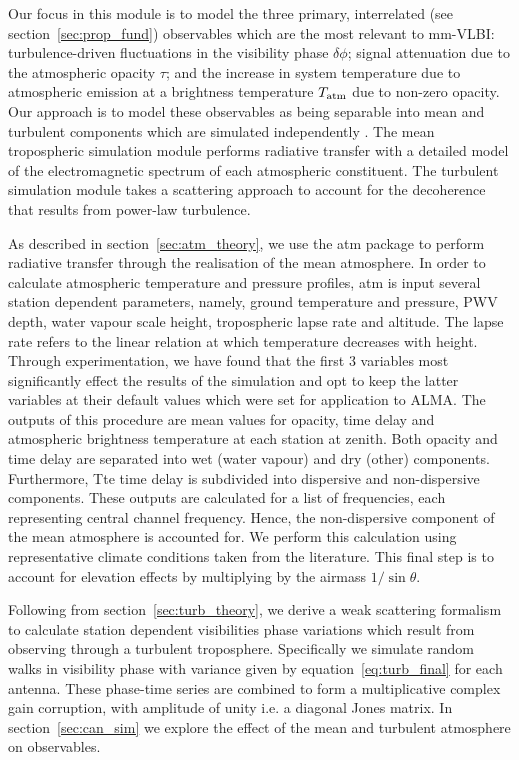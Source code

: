 Our focus in this module is to model the three primary, interrelated (see section~\ref{sec:prop_fund}) observables which are the most relevant to mm-VLBI: turbulence-driven fluctuations in the visibility phase $\delta \phi$; signal attenuation due to the atmospheric opacity $\tau$; and the increase in system temperature due to atmospheric emission at a brightness temperature $T_{\rm atm}$ due to non-zero opacity. Our approach is to model these observables as being separable into mean and turbulent components which are simulated independently \citep{Blecher_2016}. The mean tropospheric simulation module performs radiative transfer with a detailed model of the electromagnetic spectrum of each atmospheric constituent. The turbulent simulation module takes a scattering approach to account for the decoherence that results from power-law turbulence.

As described in section~\ref{sec:atm_theory}, we use the {\sc atm} package to perform radiative transfer through the realisation of the mean atmosphere. 
In order to calculate atmospheric temperature and pressure profiles, {\sc atm} is input several station dependent parameters, namely, ground temperature and pressure, PWV depth, water vapour scale height, tropospheric lapse rate  and altitude. The lapse rate refers to the linear relation at which temperature decreases with height. Through experimentation, we have found that the first 3 variables most significantly effect the results of the simulation and opt to keep the latter variables at their default values which were set for application to ALMA. 
The outputs of this procedure are mean values for opacity, time delay and atmospheric brightness temperature at each station at zenith. Both opacity and time delay are separated into wet (water vapour) and dry (other) components. Furthermore, Tte time delay is subdivided into dispersive and non-dispersive  components. These outputs are calculated for a list of frequencies, each representing central channel frequency. Hence, the non-dispersive component of the mean atmosphere is accounted for.
We perform this calculation using representative climate conditions taken from the literature. This final step is to account for elevation effects by multiplying by the airmass $1/\sin\theta$. 

Following from section~\ref{sec:turb_theory}, we derive a weak scattering formalism to calculate station dependent visibilities phase variations which result from observing through a turbulent troposphere. Specifically we simulate random walks in visibility phase with variance given by equation~\ref{eq:turb_final} for each antenna. These phase-time series are combined to form a multiplicative complex gain corruption, with amplitude of unity i.e. a diagonal Jones matrix. In section~\ref{sec:can_sim} we explore the effect of the mean and turbulent atmosphere on observables.

